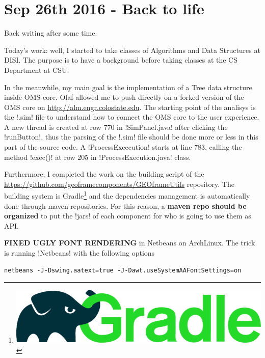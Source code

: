 \section{Sep 26th 2016 - Back to life}

Back writing after some time.

Today's work: well, I started to take classes of Algorithms and Data
Structures at DISI. The purpose is to have a background before taking
classes at the CS Department at CSU.\par\medskip

In the meanwhile, my main goal is the implementation of a Tree data
structure inside OMS core. Olaf allowed me to push directly on a
forked version of the OMS core on
\url{http://alm.engr.colostate.edu}. The starting point of the
analisys is the \inline!.sim! file to understand how to connect the
OMS core to the user experience. A new thread is created at row 770 in
\inline!SimPanel.java! after clicking the \inline!runButton!, thus the
parsing of the \inline!.sim! file should be done more or less in this
part of the source code. A \inline!ProcessExcecution! starts at line
783, calling the method \inline!exec()! at row 205 in
\inline!ProcessExecution.java! class.

Furthermore, I completed the work on the building script of the
\url{https://github.com/geoframecomponents/GEOframeUtils}
repository. The building system is
Gradle\thanks{\includegraphics{gradle.png}} and the dependencies
management is automatically done through maven repositories. For this
reason, a \textbf{maven repo should be organized} to put the
\inline!jars! of each component for who is going to use them as
API.\par\medskip

\textbf{FIXED UGLY FONT RENDERING} in Netbeans on ArchLinux. The trick
is running \inline!Netbeans! with the following options

\begin{lstlisting}[style=bashStyle]
  netbeans -J-Dswing.aatext=true -J-Dawt.useSystemAAFontSettings=on
\end{lstlisting}%

